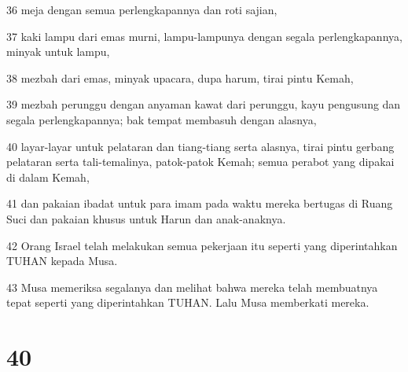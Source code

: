 \par 36 meja dengan semua perlengkapannya dan roti sajian,
\par 37 kaki lampu dari emas murni, lampu-lampunya dengan segala perlengkapannya, minyak untuk lampu,
\par 38 mezbah dari emas, minyak upacara, dupa harum, tirai pintu Kemah,
\par 39 mezbah perunggu dengan anyaman kawat dari perunggu, kayu pengusung dan segala perlengkapannya; bak tempat membasuh dengan alasnya,
\par 40 layar-layar untuk pelataran dan tiang-tiang serta alasnya, tirai pintu gerbang pelataran serta tali-temalinya, patok-patok Kemah; semua perabot yang dipakai di dalam Kemah,
\par 41 dan pakaian ibadat untuk para imam pada waktu mereka bertugas di Ruang Suci dan pakaian khusus untuk Harun dan anak-anaknya.
\par 42 Orang Israel telah melakukan semua pekerjaan itu seperti yang diperintahkan TUHAN kepada Musa.
\par 43 Musa memeriksa segalanya dan melihat bahwa mereka telah membuatnya tepat seperti yang diperintahkan TUHAN. Lalu Musa memberkati mereka.

\chapter{40}

